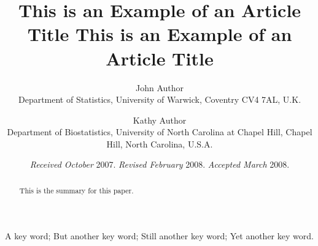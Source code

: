 \documentclass[useAMS,referee]{biom}
\title[This is an Example of Recto Running Head]{This is an Example of
an Article Title This is an Example of an Article Title}
\author
{John Author\emailx{author@address.edu} \\
Department of Statistics, University of Warwick, Coventry CV4 7AL, U.K. 
\and
Kathy Author\emailx{anotherauthor@address.edu} \\
Department of Biostatistics, University of North Carolina at Chapel Hill, 
Chapel Hill, North Carolina, U.S.A.}
\begin{document}

\date{{\it Received October} 2007. {\it Revised February} 2008.  {\it
Accepted March} 2008.}



\pagerange{\pageref{firstpage}--\pageref{lastpage}} 




\label{firstpage}


\begin{abstract}
This is the summary for this paper.
\end{abstract}

%

\begin{keywords}
A key word; But another key word; Still another key word; Yet another key word.
\end{keywords}
\end{document}
